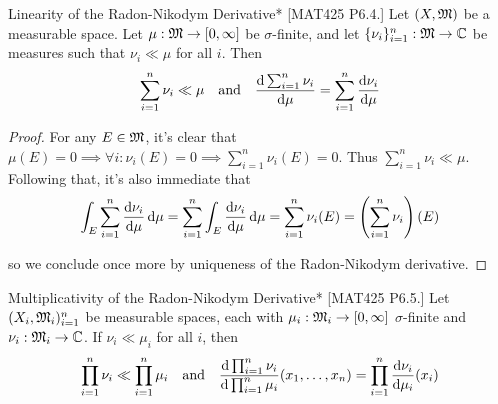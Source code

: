 \begin{problem}{Linearity of the Radon-Nikodym Derivative}*
    [MAT425 P6.4.] Let \((X, \mathfrak{M})\) be a measurable space. Let \(\mu : \mathfrak{M} \to [0, \infty]\) be \(\sigma\)-finite, and let \(\{\nu_i\}_{i=1}^n : \mathfrak{M} \to \mathbb{C}\) be measures such that \(\nu_i \ll \mu\) for all \(i\). Then 
    \[
        \sum_{i=1}^n \nu_i \ll \mu
        \quad \text{and} \quad 
        \frac{\mathrm{d} \sum_{i=1}^n \nu_i}{\mathrm{d} \mu} = \sum_{i=1}^n \frac{\mathrm{d} \nu_i}{\mathrm{d}\mu}
    \]
\end{problem}

\begin{proof}
    For any \(E \in \mathfrak{M}\), it's clear that \(\mu(E) = 0 \implies \forall i: \nu_i(E) = 0 \implies \sum_{i=1}^n \nu_i(E) = 0\). Thus \(\sum_{i=1}^n \nu_i \ll \mu\). Following that, it's also immediate that 
    \[
        \int_E \sum_{i=1}^n \frac{\mathrm{d}\nu_i}{\mathrm{d}\mu} \, \mathrm{d}\mu
        = \sum_{i=1}^n \int_E \frac{\mathrm{d}\nu_i}{\mathrm{d}\mu} \, \mathrm{d}\mu
        = \sum_{i=1}^n \nu_i(E)
        = \left( \sum_{i=1}^n \nu_i \right) (E)
    \]

    so we conclude once more by uniqueness of the Radon-Nikodym derivative. 
\end{proof}

\begin{problem}{Multiplicativity of the Radon-Nikodym Derivative}*
    [MAT425 P6.5.] Let \((X_i, \mathfrak{M}_i)_{i=1}^n\) be measurable spaces, each with \(\mu_i : \mathfrak{M}_i \to [0, \infty]\) \(\sigma\)-finite and \(\nu_i : \mathfrak{M}_i \to \mathbb{C}\). If \(\nu_i \ll \mu_i\) for all \(i\), then
    \[
        \prod_{i=1}^n \nu_i \ll \prod_{i=1}^n \mu_i 
        \quad \text{and} \quad 
        \frac{ \mathrm{d} \prod_{i=1}^n \nu_i }{ \mathrm{d} \prod_{i=1}^n \mu_i } (x_1, \dots, x_n) = \prod_{i=1}^n \frac{\mathrm{d}\nu_i}{\mathrm{d}\mu_i} (x_i) 
    \]
\end{problem}

